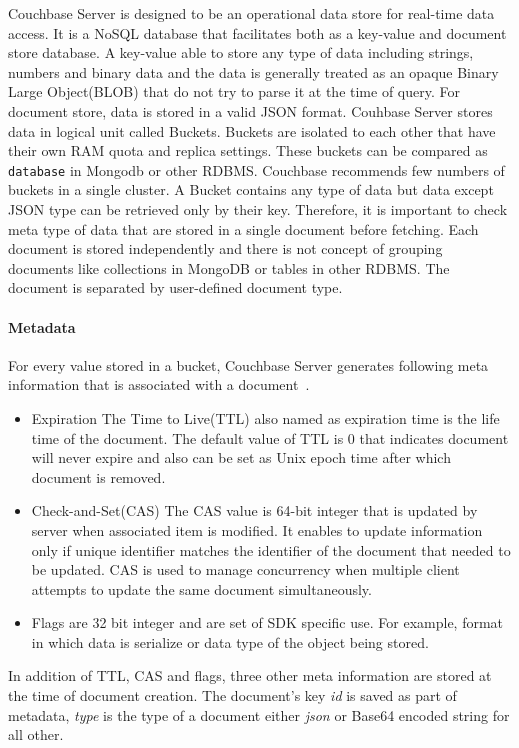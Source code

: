  Couchbase Server is designed to be an operational data store for real-time data access. It is a NoSQL database that facilitates both as a key-value and  document store database. A key-value able to store  any type of data including  strings, numbers and binary data and the data is generally treated as an opaque Binary Large Object(BLOB) that do not try to parse it at the time of query. For document store, data is stored in a valid JSON format. Couhbase Server stores data in logical unit called Buckets. Buckets are isolated to each other that have their own RAM quota and replica settings. These buckets can be compared as \texttt{database} in Mongodb or other RDBMS. Couchbase recommends few numbers of buckets in a single cluster. A Bucket  contains any type of data but data except JSON type can be retrieved only by their key. Therefore, it is important to check meta type of data that are stored in a single document before fetching. Each document is stored independently and there is not concept of grouping documents like collections in MongoDB or tables in other RDBMS. The document is separated by user-defined document type. 
\label{cb-metadata}
\paragraph{Metadata}
For every value stored in a bucket, Couchbase Server generates following meta information that is associated with a document~\cite[p. 26]{cb/ostrovsky2014pro}. 
\begin{itemize}
	\item{Expiration}
		The Time to Live(TTL) also named as expiration time is the life time of the document. The default value of TTL is 0 that indicates document will never expire and also can be set as Unix epoch time after which document is removed.
	
	\item{Check-and-Set(CAS)}
		The CAS value is 64-bit integer that is updated by server when associated item is modified. It enables to update information only if unique identifier matches the identifier of the document that needed to be updated. CAS is used to manage concurrency when multiple client attempts to update the same document simultaneously. 
	\item{Flags} are 32 bit integer and are set of SDK specific use. For example, format in which data is serialize or data type of the object being stored. 
\end{itemize}	
In addition of TTL, CAS and flags, three other meta information are stored at the time of document creation. The document's key \textit{id} is saved as part of metadata, \textit{type} is the type of a document either \textit{json} or Base64 encoded string for all other.
